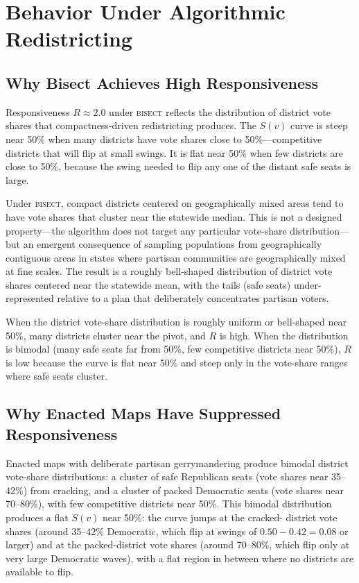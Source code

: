 \section{Behavior Under Algorithmic Redistricting}
\label{sec:behavior}

\subsection{Why Bisect Achieves High Responsiveness}

Responsiveness $R \approx 2.0$ under \textsc{bisect} reflects the distribution
of district vote shares that compactness-driven redistricting produces. The
$S(v)$ curve is steep near 50\% when many districts have vote shares close to
50\%---competitive districts that will flip at small swings. It is flat near
50\% when few districts are close to 50\%, because the swing needed to flip any
one of the distant safe seats is large.

Under \textsc{bisect}, compact districts centered on geographically mixed areas
tend to have vote shares that cluster near the statewide median. This is not a
designed property---the algorithm does not target any particular vote-share
distribution---but an emergent consequence of sampling populations from
geographically contiguous areas in states where partisan communities are
geographically mixed at fine scales. The result is a roughly bell-shaped
distribution of district vote shares centered near the statewide mean, with
the tails (safe seats) under-represented relative to a plan that deliberately
concentrates partisan voters.

When the district vote-share distribution is roughly uniform or bell-shaped near
50\%, many districts cluster near the pivot, and $R$ is high. When the distribution
is bimodal (many safe seats far from 50\%, few competitive districts near 50\%),
$R$ is low because the curve is flat near 50\% and steep only in the vote-share
ranges where safe seats cluster.

\subsection{Why Enacted Maps Have Suppressed Responsiveness}

Enacted maps with deliberate partisan gerrymandering produce bimodal district
vote-share distributions: a cluster of safe Republican seats (vote shares near
35--42\%) from cracking, and a cluster of packed Democratic seats (vote shares
near 70--80\%), with few competitive districts near 50\%. This bimodal
distribution produces a flat $S(v)$ near 50\%: the curve jumps at the cracked-
district vote shares (around 35--42\% Democratic, which flip at swings of
$0.50 - 0.42 = 0.08$ or larger) and at the packed-district vote shares
(around 70--80\%, which flip only at very large Democratic waves), with a
flat region in between where no districts are available to flip.


